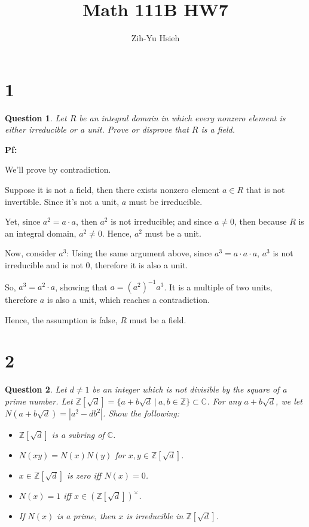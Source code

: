 \documentclass{article}
\title{Math 111B HW7}
\author{Zih-Yu Hsieh}
\newtheorem{question}{Question}
\begin{document}
\maketitle

\section*{1}
\begin{myBox}[]{}
    \begin{question}
        Let $R$ be an integral domain in which every nonzero element is either irreducible
        or a unit. Prove or disprove that $R$ is a field. 
    \end{question}
\end{myBox}

\textbf{Pf:}

We'll prove by contradiction.

Suppose it is not a field, then there exists nonzero element $a\in R$ that is not invertible.
Since it's not a unit, $a$ must be irreducible.

Yet, since $a^2=a\cdot a$, then $a^2$ is not irreducible; and since $a\neq 0$, then because $R$ is an integral domain,
$a^2\neq 0$. Hence, $a^2$ must be a unit.

Now, consider $a^3$: Using the same argument above, since $a^3=a\cdot a\cdot a$, $a^3$ is not irreducible and is not $0$, 
therefore it is also a unit.

So, $a^3 = a^2\cdot a$, showing that $a = (a^2)^{-1}a^3$. It is a multiple of two units, therefore $a$ is also a unit, which reaches a contradiction.

Hence, the assumption is false, $R$ must be a field.

\hfil

\hfil

\section*{2}
\begin{myBox}[]{}
    \begin{question}
        Let $d\neq 1$ be an integer which is not divisible by the square of a prime number.
        Let $\mathbb{Z}[\sqrt{d}]=\{a+b\sqrt{d}\ |\ a,b\in\mathbb{Z}\}\subset \mathbb{C}$. 
        For any $a+b\sqrt{d}$, we let $N(a+b\sqrt{d})=|a^2-db^2|$. Show the following:
        \begin{itemize}
            \item[(1)] $\mathbb{Z}[\sqrt{d}]$ is a subring of $\mathbb{C}$.
            \item[(2)] $N(xy)=N(x)N(y)$ for $x,y\in\mathbb{Z}[\sqrt{d}]$.
            \item[(3)] $x\in\mathbb{Z}[\sqrt{d}]$ is zero iff $N(x)=0$.
            \item[(4)] $N(x)=1$ iff $x\in(\mathbb{Z}[\sqrt{d}])^\times$.
            \item[(5)] If $N(x)$ is a prime, then $x$ is irreducible in $\mathbb{Z}[\sqrt{d}]$.
        \end{itemize}
    \end{question}
\end{myBox}
\end{document}
